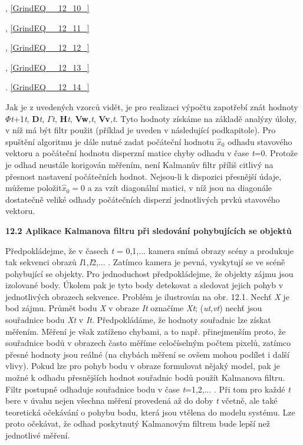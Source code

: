  , \eqref{GrindEQ__12_10_}

 , \eqref{GrindEQ__12_11_}

 , \eqref{GrindEQ__12_12_}

 , \eqref{GrindEQ__12_13_}

 . \eqref{GrindEQ__12_14_}

\noindent Jak je z uvedených vzorců vidět, je pro realizaci výpočtu zapotřebí znát hodnoty \textbf{$\Phi$}\textit{t}+1\textbar \textit{t}, \textbf{D}\textit{t}, \textbf{$\Gamma$}\textit{t}, \textbf{H}\textit{t}, \textbf{Vw}\textit{,t}, \textbf{Vv}\textit{,t}. Tyto hodnoty získáme na základě analýzy úlohy, v níž má být filtr použit (příklad je uveden v následující podkapitole). Pro spuštění algoritmu je dále nutné zadat počáteční hodnotu $\hat{x}_{0} $ odhadu stavového vektoru a počáteční hodnotu  disperzní matice chyby odhadu v čase \textit{t}=0. Protože je odhad neustále korigován měřením, není Kalmanův filtr příliš citlivý na přesnost nastavení počátečních hodnot. Nejsou-li k dispozici přesnější údaje, můžeme položit$\hat{x}_{0} =0$ a za vzít diagonální matici, v níž jsou na diagonále dostatečně veliké odhady počátečních disperzí jednotlivých prvků stavového vektoru.

\noindent \textbf{12.2  Aplikace  Kalmanova filtru při sledování pohybujících se objektů}

\noindent Předpokládejme, že v časech \textit{t} = 0,1,... kamera snímá obrazy scény a produkuje tak sekvenci obrazů \textit{I}1,\textit{I}2,... . Zatímco kamera je pevná, vyskytují se ve scéně pohybující se objekty. Pro jednoduchost předpokládejme, že objekty zájmu jsou izolované body. Úkolem pak je tyto body detekovat a sledovat jejich pohyb v jednotlivých obrazech sekvence. Problém je ilustrován na obr. 12.1. Nechť \textit{X} je bod zájmu. Průmět bodu \textit{X} v obraze \textit{It} označíme \textit{Xt}; (\textit{ut},\textit{vt}) nechť jsou souřadnice bodu \textit{Xt} v \textit{It}.  Předpokládáme, že hodnoty souřadnic lze získat měřením. Měření je však zatíženo chybami, a to např. přinejmenším proto, že souřadnice bodů v obrazech často měříme celočíselným počtem pixelů, zatímco přesné hodnoty jsou reálné (na chybách měření se ovšem mohou podílet i další vlivy). Pokud lze pro pohyb bodu v obraze formulovat nějaký model, pak je možné k odhadu přesnějších hodnot souřadnic bodů použít Kalmanova filtru. Filtr postupně odhaduje souřadnice bodu v čase \textit{t}=1,2,... . Při tom pro každé \textit{t} bere v úvahu nejen všechna měření provedená až do doby \textit{t} včetně, ale také teoretická očekávání o pohybu bodu, která jsou vtělena do modelu systému. Lze proto očekávat, že odhad poskytnutý Kalmanovým filtrem bude lepší než jednotlivé měření.

